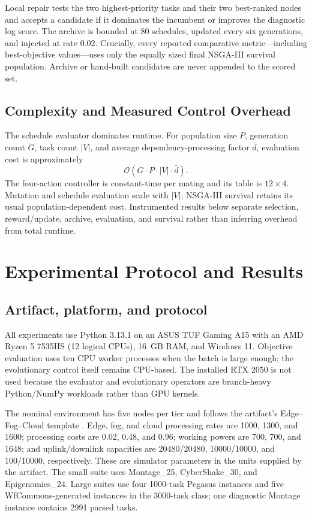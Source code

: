 \documentclass[preprint,12pt]{elsarticle}
\begin{document}
Local repair tests the two highest-priority tasks and their two best-ranked nodes and accepts a candidate if it dominates the incumbent or improves the diagnostic log score. The archive is bounded at 80 schedules, updated every six generations, and injected at rate 0.02. Crucially, every reported comparative metric---including best-objective values---uses only the equally sized final NSGA-III survival population. Archive or hand-built candidates are never appended to the scored set.

\subsection{Complexity and Measured Control Overhead}
The schedule evaluator dominates runtime. For population size $P$, generation count $G$, task count $|V|$, and average dependency-processing factor $\bar d$, evaluation cost is approximately
\begin{equation}
\mathcal{O}(G \cdot P \cdot |V| \cdot \bar d).
\end{equation}
The four-action controller is constant-time per mating and its table is $12\times4$. Mutation and schedule evaluation scale with $|V|$; NSGA-III survival retains its usual population-dependent cost. Instrumented results below separate selection, reward/update, archive, evaluation, and survival rather than inferring overhead from total runtime.

\section{Experimental Protocol and Results}
\subsection{Artifact, platform, and protocol}
All experiments use Python 3.13.1 on an ASUS TUF Gaming A15 with an AMD Ryzen 5 7535HS (12 logical CPUs), 16~GB RAM, and Windows 11. Objective evaluation uses ten CPU worker processes when the batch is large enough; the evolutionary control itself remains CPU-based. The installed RTX 2050 is not used because the evaluator and evolutionary operators are branch-heavy Python/NumPy workloads rather than GPU kernels.

The nominal environment has five nodes per tier and follows the artifact's Edge--Fog--Cloud template \cite{mohan2016edgefog}. Edge, fog, and cloud processing rates are 1000, 1300, and 1600; processing costs are 0.02, 0.48, and 0.96; working powers are 700, 700, and 1648; and uplink/downlink capacities are 20480/20480, 10000/10000, and 100/10000, respectively. These are simulator parameters in the units supplied by the artifact. The small suite uses Montage\_25, CyberShake\_30, and Epigenomics\_24. Large suites use four 1000-task Pegasus instances and five WfCommons-generated instances in the 3000-task class; one diagnostic Montage instance contains 2991 parsed tasks.
\end{document}
